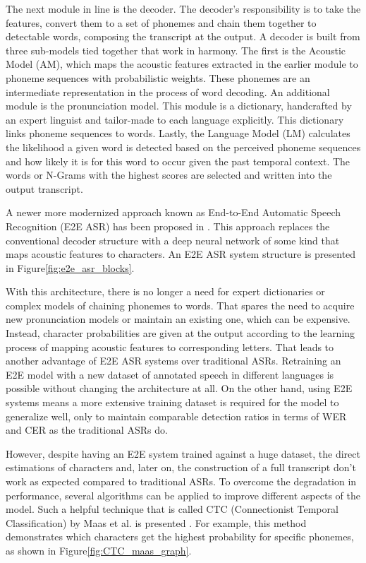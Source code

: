 The next module in line is the decoder. The decoder's responsibility is to take the features, convert them to a set of phonemes and chain them together to detectable words, composing the transcript at the output.
A decoder is built from three sub-models tied
together that work in harmony. 
The first is the Acoustic Model (AM), which maps the acoustic features extracted in the earlier module to phoneme sequences with probabilistic weights.
These phonemes are an intermediate representation in the process of word decoding.
An additional module is the pronunciation model. This module is a dictionary, handcrafted by an expert linguist and tailor-made to each language explicitly.
This dictionary links phoneme sequences
to words. 
Lastly, the Language Model (LM) calculates the likelihood a given word is detected based on the perceived phoneme sequences and how likely it is for this word to occur given the past temporal context.
The words or N-Grams with the highest scores are selected and written into the output transcript.

A newer more modernized approach known as 
End-to-End Automatic Speech
Recognition (E2E ASR) has been proposed 
in \cite{pmlr-v32-graves14}. This approach 
replaces the conventional decoder structure with 
a deep neural network of some kind that maps 
acoustic features to characters. An E2E ASR system
structure is presented in Figure\;\ref{fig:e2e_asr_blocks}.

With this architecture, there is no longer a need for expert 
dictionaries or complex models of chaining phonemes to words.
That spares the need to acquire new pronunciation models or maintain an existing one, which can be expensive. 
Instead, character probabilities 
are given at the output according to the learning
process of mapping acoustic features to 
corresponding letters.
That leads to another advantage of E2E ASR systems
over traditional ASRs. 
Retraining an E2E model with 
a new dataset of annotated speech in different 
languages is possible without changing the architecture at all.
On the other hand, 
using E2E systems means a more extensive training dataset is 
required for the model to generalize well, 
only to maintain comparable detection 
ratios in terms of WER and CER as the traditional ASRs do.

However, despite having an E2E system trained against a huge dataset, the direct estimations of characters and, later on, the construction of a full 
transcript don't work as expected compared to traditional ASRs.
To overcome the degradation in performance, several algorithms
can be applied to improve different aspects of the model.
Such a helpful technique that is 
called CTC (Connectionist Temporal Classification) 
by Maas et al. is presented \cite{maas-etal-2015-lexicon}.
For example, this method demonstrates which characters get the highest 
probability for specific phonemes, 
as shown in
Figure\;\ref{fig:CTC_maas_graph}. 

